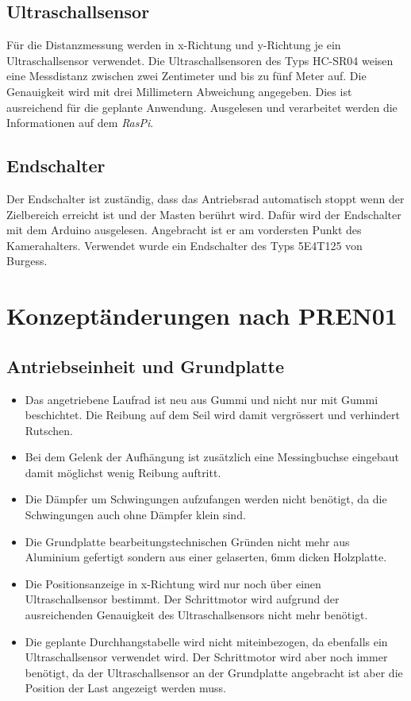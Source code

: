 \documentclass[a4paper]{report}
\begin{document}
\subsection{Ultraschallsensor}
\label{ssec:Ultraschallsensor}
Für die Distanzmessung werden in x-Richtung und y-Richtung je ein Ultraschallsensor verwendet. Die Ultraschallsensoren des Typs HC-SR04 weisen eine Messdistanz zwischen zwei Zentimeter und bis zu fünf Meter auf. Die Genauigkeit wird mit drei Millimetern Abweichung angegeben. Dies ist ausreichend für die geplante Anwendung. Ausgelesen und verarbeitet werden die Informationen auf dem \textit{RasPi}.



\subsection{Endschalter}
\label{ssec:Endschalter}
Der Endschalter ist zuständig, dass das Antriebsrad automatisch stoppt wenn der Zielbereich erreicht ist und der Masten berührt wird. Dafür wird der Endschalter mit dem Arduino ausgelesen. Angebracht ist er am vordersten Punkt des Kamerahalters. Verwendet wurde ein Endschalter des Typs 5E4T125 von Burgess.


\section{Konzeptänderungen nach PREN01}
\label{sec:Konzeptaenderungen}

\subsection{Antriebseinheit und Grundplatte}

\begin{itemize}
		\item Das angetriebene Laufrad ist neu aus Gummi und nicht nur mit Gummi beschichtet. Die Reibung auf dem Seil wird damit vergrössert und verhindert Rutschen.
		\item Bei dem Gelenk der Aufhängung ist zusätzlich eine Messingbuchse eingebaut damit möglichst wenig Reibung auftritt.
		\item Die Dämpfer um Schwingungen aufzufangen werden nicht benötigt, da die Schwingungen auch ohne Dämpfer klein sind.
		\item Die Grundplatte bearbeitungstechnischen Gründen nicht mehr aus Aluminium gefertigt sondern aus einer gelaserten, 6mm dicken Holzplatte.
		\item Die Positionsanzeige in x-Richtung wird nur noch über einen Ultraschallsensor bestimmt. Der Schrittmotor wird aufgrund der ausreichenden Genauigkeit des Ultraschallsensors nicht mehr benötigt.
		\item Die geplante Durchhangstabelle wird nicht miteinbezogen, da ebenfalls ein Ultraschallsensor verwendet wird. Der Schrittmotor wird aber noch immer benötigt, da der Ultraschallsensor an der Grundplatte angebracht ist aber die Position der Last angezeigt werden muss.
\end{itemize}
\end{document}
